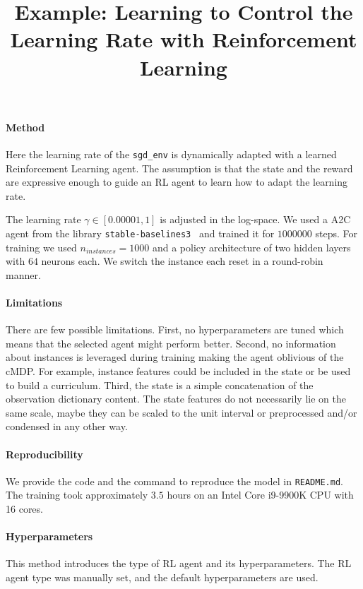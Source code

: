 \documentclass[11pt, final]{article}
\title{Example: Learning to Control the Learning Rate with Reinforcement Learning}
\author[1,2]{\nameemail{Carolin Benjamins}{}}
\affil[1]{Leibniz University Hannover}
\affil[2]{\url{https://www.AutoML.org}}
\begin{document}
\maketitle

\paragraph{Method}
Here the learning rate of the \texttt{sgd\_env} is dynamically adapted with a learned
Reinforcement Learning agent.
The assumption is that the state and the reward are expressive enough to guide an RL agent
to learn how to adapt the learning rate.

The learning rate $\gamma \in [0.00001, 1]$ is adjusted in the log-space.
We used a A2C~\citep{mnih-icml16} agent from the library \texttt{stable-baselines3}~\citep{stable-baselines3}
and trained it for $1000000$ steps.
For training we used $n_{instances} = 1000$ and a policy architecture of two hidden layers
with $64$ neurons each.
We switch the instance each reset in a round-robin manner.

\paragraph{Limitations}
There are few possible limitations.
First, no hyperparameters are tuned which means that the selected agent might perform better.
Second, no information about instances is leveraged during training making the agent oblivious of the cMDP.
For example, instance features could be included in the state or be used to build a curriculum.
Third, the state is a simple concatenation of the observation dictionary content.
The state features do not necessarily lie on the same scale, maybe they can be scaled to the unit interval or
preprocessed and/or condensed in any other way.

\paragraph{Reproducibility}
We provide the code and the command to reproduce the model in \texttt{README.md}.
The training took approximately $3.5$ hours on an Intel Core i9-9900K CPU with 16 cores.

\paragraph{Hyperparameters}
This method introduces the type of RL agent and its hyperparameters.
The RL agent type was manually set, and the default hyperparameters are used.



\end{document}

